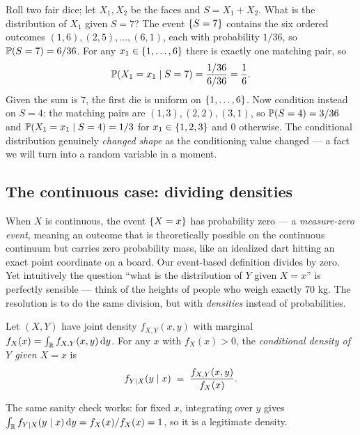 \begin{example}
\label{ch15:ex-two-dice}
Roll two fair dice; let $X_1, X_2$ be the faces and $S = X_1 + X_2$. What is the distribution of
$X_1$ given $S = 7$? The event $\set{S=7}$ contains the six ordered outcomes
$(1,6),(2,5),\dots,(6,1)$, each with probability $1/36$, so $\P(S=7) = 6/36$. For any
$x_1 \in \set{1,\dots,6}$ there is exactly one matching pair, so
\[
  \P(X_1 = x_1 \given S = 7) = \frac{1/36}{6/36} = \frac{1}{6}.
\]
Given the sum is $7$, the first die is uniform on $\set{1,\dots,6}$. Now condition instead on $S=4$:
the matching pairs are $(1,3),(2,2),(3,1)$, so $\P(S=4) = 3/36$ and
$\P(X_1 = x_1 \given S=4) = 1/3$ for $x_1 \in \set{1,2,3}$ and $0$ otherwise. The conditional
distribution genuinely \emph{changed shape} as the conditioning value changed --- a fact we will turn
into a random variable in a moment.
\end{example}

\subsection{The continuous case: dividing densities}
When $X$ is continuous, the event $\set{X=x}$ has probability zero --- a \emph{measure-zero event},
meaning an outcome that is theoretically possible on the continuous continuum but carries zero
probability mass, like an idealized dart hitting an exact point coordinate on a board. Our event-based
definition divides by zero. Yet intuitively the question ``what is the distribution of $Y$ given $X = x$'' is
perfectly sensible --- think of the heights of people who weigh exactly $70$ kg. The resolution is to
do the same division, but with \emph{densities} instead of probabilities.

\begin{definition}
\label{ch15:def-cond-density}
Let $(X,Y)$ have joint density $f_{X,Y}(x,y)$ with marginal $f_X(x) = \int_{\R} f_{X,Y}(x,y)\,\dd y$.
For any $x$ with $f_X(x) > 0$, the \emph{conditional density of $Y$ given $X=x$} is
\[
  f_{Y \given X}(y \given x) \;=\; \frac{f_{X,Y}(x,y)}{f_X(x)}.
\]
\end{definition}

The same sanity check works: for fixed $x$, integrating over $y$ gives
$\int_\R f_{Y\given X}(y\given x)\,\dd y = f_X(x)/f_X(x) = 1$, so it is a legitimate density.

